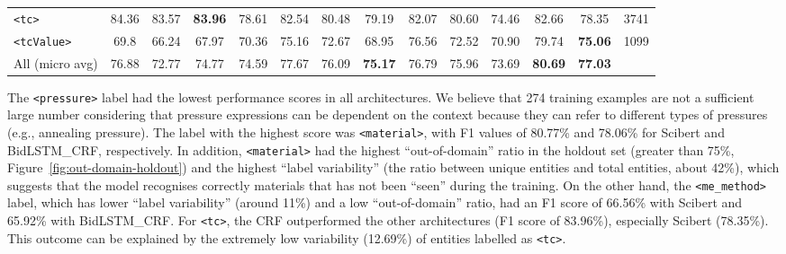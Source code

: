 \begin{table}[ht]
{\begin{tabular}{l ccc ccc ccc ccc r}
            \texttt{<tc>}         & 84.36                            & 83.57                                     & \textbf{83.96}                                     & 78.61      & 82.54      & 80.48          & 79.19          & 82.07      & 80.60          & 74.46      & 82.66          & 78.35          & 3741 \\
            \texttt{<tcValue>}    & 69.8                             & 66.24                                     & 67.97                                              & 70.36      & 75.16      & 72.67          & 68.95          & 76.56      & 72.52          & 70.90      & 79.74          & \textbf{75.06} & 1099 \\
            \midrule
            All (micro avg)       & 76.88                            & 72.77                                     & 74.77                                              & 74.59      & 77.67      & 76.09          & \textbf{75.17} & 76.79      & 75.96          & 73.69      & \textbf{80.69} & \textbf{77.03}        \\
            \bottomrule
        \end{tabular}
    }
    
    \label{tab:evaluation-superconductors-ML-model} 
\end{table}

The \texttt{<pressure>} label had the lowest performance scores in all architectures. We believe that 274 training examples are not a sufficient large number considering that pressure expressions can be dependent on the context because they can refer to different types of pressures (e.g., annealing pressure).
The label with the highest score was \texttt{<material>}, with F1 values of 80.77\% and 78.06\% for Scibert and BidLSTM\_CRF, respectively. In addition, \texttt{<material>} had the highest ``out-of-domain'' ratio in the holdout set (greater than 75\%, Figure~\ref{fig:out-domain-holdout}) and the highest ``label variability'' (the ratio between unique entities and total entities, about 42\%), which suggests that the model recognises correctly materials that has not been ``seen'' during the training.
On the other hand, the \texttt{<me\_method>} label, which has lower ``label variability'' (around 11\%) and a low ``out-of-domain'' ratio, had an F1 score of 66.56\% with Scibert and 65.92\% with BidLSTM\_CRF.
For \texttt{<tc>}, the CRF outperformed the other architectures (F1 score of 83.96\%), especially Scibert (78.35\%). 
This outcome can be explained by the extremely low variability (12.69\%) of entities labelled as \texttt{<tc>}. %

